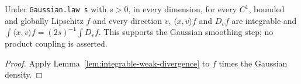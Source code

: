 \begin{lemma}
  \label{lem:gaussian-directional-identity}
  \leanok
  Under \texttt{Gaussian.law s} with $s>0$, in every dimension, for every $C^1$, bounded and globally Lipschitz $f$ and every direction $v$,
  $\langle x,v\rangle f$ and $D_vf$ are integrable and $\int\langle x,v\rangle f=(2s)^{-1}\int D_vf$. This supports the Gaussian smoothing
  step; no product coupling is asserted.
\end{lemma}
\begin{proof}
  \leanok
  Apply Lemma~\ref{lem:integrable-weak-divergence} to $f$ times the Gaussian density.
\end{proof}

